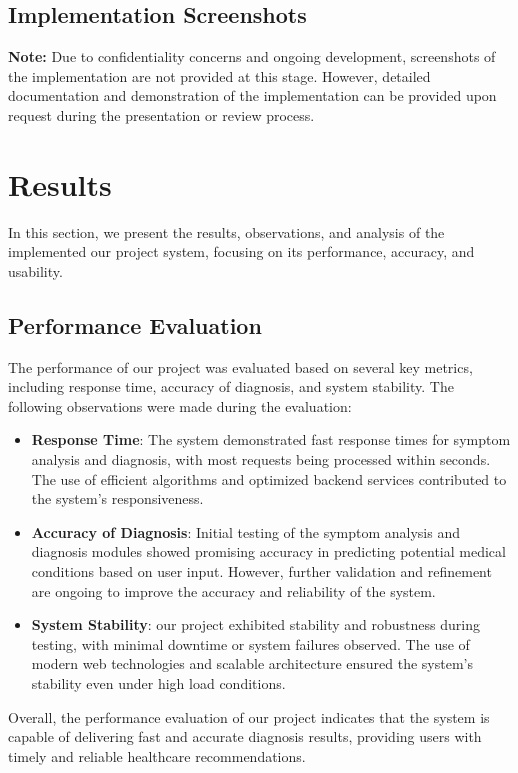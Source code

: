 \documentclass[onecolumn]{article}
\begin{document}
\subsection{Implementation Screenshots}
\textbf{Note:} Due to confidentiality concerns and ongoing development, screenshots of the implementation are not provided at this stage. However, detailed documentation and demonstration of the implementation can be provided upon request during the presentation or review process.

\section{Results}
In this section, we present the results, observations, and analysis of the implemented our project system, focusing on its performance, accuracy, and usability.

\subsection{Performance Evaluation}
The performance of our project was evaluated based on several key metrics, including response time, accuracy of diagnosis, and system stability. The following observations were made during the evaluation:

\begin{itemize}
\item \textbf{Response Time}: The system demonstrated fast response times for symptom analysis and diagnosis, with most requests being processed within seconds. The use of efficient algorithms and optimized backend services contributed to the system's responsiveness.

\item \textbf{Accuracy of Diagnosis}: Initial testing of the symptom analysis and diagnosis modules showed promising accuracy in predicting potential medical conditions based on user input. However, further validation and refinement are ongoing to improve the accuracy and reliability of the system.

\item \textbf{System Stability}: our project exhibited stability and robustness during testing, with minimal downtime or system failures observed. The use of modern web technologies and scalable architecture ensured the system's stability even under high load conditions.
\end{itemize}

Overall, the performance evaluation of our project indicates that the system is capable of delivering fast and accurate diagnosis results, providing users with timely and reliable healthcare recommendations.
\end{document}
